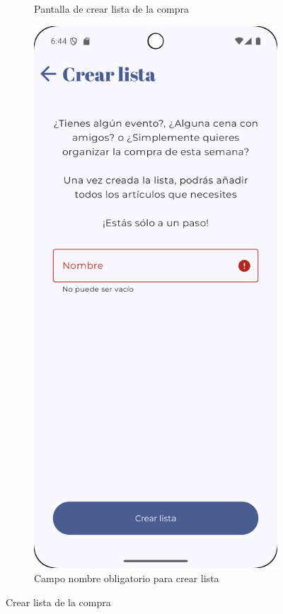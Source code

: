 \begin{figure}[H]
\begin{subfigure}[b]{0.3\textwidth}
      \caption{Pantalla de crear lista de la compra}
      \label{fig:create-shopping}
    \end{subfigure}
    \hfill
    \begin{subfigure}[b]{0.3\textwidth}
      \includegraphics[width=\textwidth]{./img/manual/pinche_create_list_empty_name.png}
      \caption{Campo nombre obligatorio para crear lista}
      \label{fig:create-shopping-name}
    \end{subfigure}

    \caption{Crear lista de la compra}
    \label{fig:create-list}
\end{figure}

